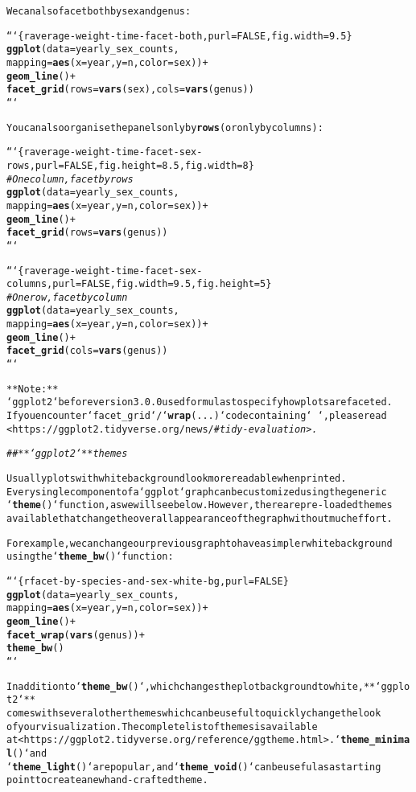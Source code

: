 \documentclass{article}\usepackage[]{graphicx}\usepackage[]{xcolor}
\makeatletter
\newcommand{\hlcom}[1]{\textcolor[rgb]{0.678,0.584,0.686}{\textit{#1}}}%
\newcommand{\hlkwd}[1]{\textcolor[rgb]{0.737,0.353,0.396}{\textbf{#1}}}%
\newenvironment{kframe}{%
 \def\at@end@of@kframe{}%
 \ifinner\ifhmode%
  \def\at@end@of@kframe{\end{minipage}}%
  \begin{minipage}{\columnwidth}%
 \fi\fi%
 \def\FrameCommand##1{\hskip\@totalleftmargin \hskip-\fboxsep
 \colorbox{shadecolor}{##1}\hskip-\fboxsep
     \hskip-\linewidth \hskip-\@totalleftmargin \hskip\columnwidth}%
 \MakeFramed {\advance\hsize-\width
   \@totalleftmargin\z@ \linewidth\hsize
   \@setminipage}}%
 {\par\unskip\endMakeFramed%
 \at@end@of@kframe}
\newenvironment{knitrout}{}{} %
\makeatother
\begin{document}
\begin{knitrout}
\begin{kframe}
\begin{alltt}
We can also facet both by sex and genus:

```\{r average-weight-time-facet-both, purl=FALSE, fig.width=9.5\}
\hlkwd{ggplot}(data = yearly_sex_counts,
       mapping = \hlkwd{aes}(x = year, y = n, color = sex)) +
  \hlkwd{geom_line}() +
  \hlkwd{facet_grid}(rows = \hlkwd{vars}(sex), cols =  \hlkwd{vars}(genus))
```

You can also organise the panels only by \hlkwd{rows} (or only by columns):

```\{r average-weight-time-facet-sex-rows, purl=FALSE, fig.height=8.5, fig.width=8\}
\hlcom{# One column, facet by rows}
\hlkwd{ggplot}(data = yearly_sex_counts,
       mapping = \hlkwd{aes}(x = year, y = n, color = sex)) +
  \hlkwd{geom_line}() +
  \hlkwd{facet_grid}(rows = \hlkwd{vars}(genus))
```

```\{r average-weight-time-facet-sex-columns, purl=FALSE, fig.width=9.5, fig.height=5\}
\hlcom{# One row, facet by column}
\hlkwd{ggplot}(data = yearly_sex_counts,
       mapping = \hlkwd{aes}(x = year, y = n, color = sex)) +
  \hlkwd{geom_line}() +
  \hlkwd{facet_grid}(cols = \hlkwd{vars}(genus))
```


**Note:**
`ggplot2` before version 3.0.0 used formulas to specify how plots are faceted.
If you encounter `facet_grid`/`\hlkwd{wrap}(...)` code containing `~`, please read
<https://ggplot2.tidyverse.org/news/\hlcom{#tidy-evaluation>.}


\hlcom{## **`ggplot2`** themes}

Usually plots with white background look more readable when printed.
Every single component of a `ggplot` graph can be customized using the generic
`\hlkwd{theme}()` function, as we will see below. However, there are pre-loaded themes
available that change the overall appearance of the graph without much effort.

For example, we can change our previous graph to have a simpler white background
using the `\hlkwd{theme_bw}()` function:

```\{r facet-by-species-and-sex-white-bg, purl=FALSE\}
 \hlkwd{ggplot}(data = yearly_sex_counts,
        mapping = \hlkwd{aes}(x = year, y = n, color = sex)) +
     \hlkwd{geom_line}() +
     \hlkwd{facet_wrap}(\hlkwd{vars}(genus)) +
     \hlkwd{theme_bw}()
```

In addition to `\hlkwd{theme_bw}()`, which changes the plot background to white, **`ggplot2`**
comes with several other themes which can be useful to quickly change the look
of your visualization. The complete list of themes is available
at <https://ggplot2.tidyverse.org/reference/ggtheme.html>. `\hlkwd{theme_minimal}()` and
`\hlkwd{theme_light}()` are popular, and `\hlkwd{theme_void}()` can be useful as a starting
point to create a new hand-crafted theme.


\end{alltt}
\end{kframe}
\end{knitrout}
\end{document}
